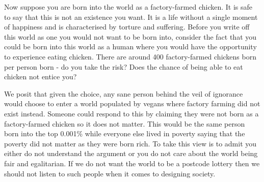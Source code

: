Now suppose you are born into the world as a factory-farmed chicken. It is safe to say that this is not an existence you want. It is a life without a single moment of happiness and is characterised by torture and suffering. Before you write off this world as one you would not want to be born into, consider the fact that you could be born into this world as a human where you would have the opportunity to experience eating chicken. There are around 400 factory-farmed chickens born per person born - do you take the risk? Does the chance of being able to eat chicken not entice you?

We posit that given the choice, any sane person behind the veil of ignorance would choose to enter a world populated by vegans where factory farming did not exist instead. Someone could respond to this by claiming they were not born as a factory-farmed chicken so it does not matter. This would be the same person born into the top 0.001\% while everyone else lived in poverty saying that the poverty did not matter as they were born rich. To take this view is to admit you either do not understand the argument or you do not care about the world being fair and egalitarian. If we do not want the world to be a postcode lottery then we should not listen to such people when it comes to designing society.